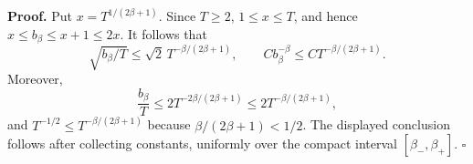 \textbf{Proof.} Put \(x=T^{1/(2\beta+1)}\). Since \(T\ge2\), \(1\le x\le T\), and hence \(x\le b_\beta\le x+1\le2x\). It follows that
\[
\sqrt{b_\beta/T}
\le \sqrt2\,T^{-\beta/(2\beta+1)},
\qquad
Cb_\beta^{-\beta}
\le C T^{-\beta/(2\beta+1)}.
\]
Moreover,
\[
\frac{b_\beta}{T}
\le 2T^{-2\beta/(2\beta+1)}
\le 2T^{-\beta/(2\beta+1)},
\]
and \(T^{-1/2}\le T^{-\beta/(2\beta+1)}\) because \(\beta/(2\beta+1)<1/2\). The displayed conclusion follows after collecting constants, uniformly over the compact interval \([\beta_-,\beta_+]\). \(\square\)